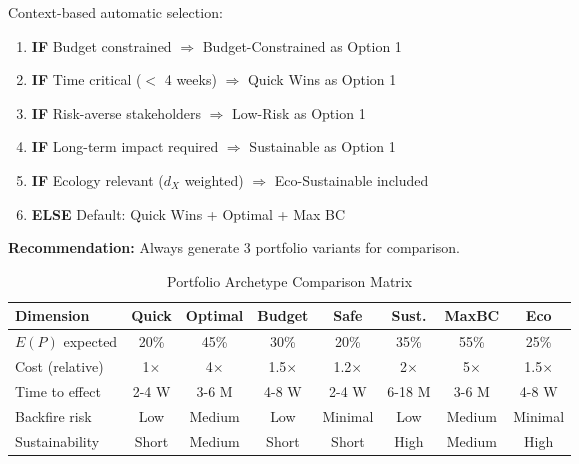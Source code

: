 \begin{tcolorbox}[colback=green!5!white, colframe=green!75!black,
    title=\textbf{Archetype Selection Rules}]

Context-based automatic selection:

\begin{enumerate}[nosep]
\item \textbf{IF} Budget constrained $\Rightarrow$ Budget-Constrained as Option 1
\item \textbf{IF} Time critical ($<$ 4 weeks) $\Rightarrow$ Quick Wins as Option 1
\item \textbf{IF} Risk-averse stakeholders $\Rightarrow$ Low-Risk as Option 1
\item \textbf{IF} Long-term impact required $\Rightarrow$ Sustainable as Option 1
\item \textbf{IF} Ecology relevant ($d_X$ weighted) $\Rightarrow$ Eco-Sustainable included
\item \textbf{ELSE} Default: Quick Wins + Optimal + Max BC
\end{enumerate}

\textbf{Recommendation:} Always generate 3 portfolio variants for comparison.
\end{tcolorbox}

\begin{table}[htbp]
\centering
\caption{Portfolio Archetype Comparison Matrix}
\label{tab:hhh-archetype-comparison}
\renewcommand{\arraystretch}{1.3}
\footnotesize
\begin{tabular}{@{}lccccccc@{}}
\toprule
\textbf{Dimension} & \textbf{Quick} & \textbf{Optimal} & \textbf{Budget} & \textbf{Safe} & \textbf{Sust.} & \textbf{MaxBC} & \textbf{Eco} \\
\midrule
$E(P)$ expected & 20\% & 45\% & 30\% & 20\% & 35\% & 55\% & 25\% \\
Cost (relative) & 1$\times$ & 4$\times$ & 1.5$\times$ & 1.2$\times$ & 2$\times$ & 5$\times$ & 1.5$\times$ \\
Time to effect & 2-4 W & 3-6 M & 4-8 W & 2-4 W & 6-18 M & 3-6 M & 4-8 W \\
Backfire risk & Low & Medium & Low & Minimal & Low & Medium & Minimal \\
Sustainability & Short & Medium & Short & Short & High & Medium & High \\
\bottomrule
\end{tabular}
\end{table}


